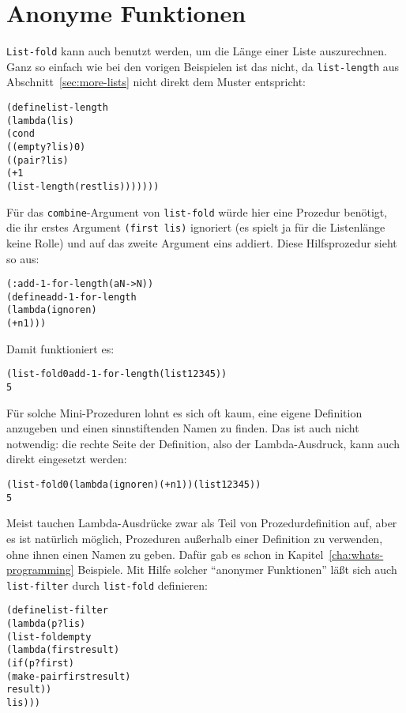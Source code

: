 \section{Anonyme Funktionen}\label{sec:anonymous-procedures}

\texttt{List-fold} kann auch benutzt werden, um die Länge einer Liste
auszurechnen.  Ganz so einfach wie bei den vorigen Beispielen ist das
nicht, da \texttt{list-length} aus
Abschnitt~\ref{sec:more-lists} nicht direkt dem Muster entspricht:
%
\begin{alltt}
(define list-length
  (lambda (lis)
    (cond
      ((empty? lis) 0)
      ((pair? lis) 
       (+ 1 
          (list-length (rest lis)))))))
\end{alltt}
%
Für das \texttt{combine}-Argument von \texttt{list-fold}
würde hier eine Prozedur benötigt, die ihr erstes
Argument \texttt{(first lis)} ignoriert (es spielt ja für die Listenlänge
keine Rolle) und auf das zweite Argument eins addiert.  Diese
Hilfsprozedur sieht so aus:
%
\begin{alltt}
(: add-1-for-length (a N -> N))
(define add-1-for-length
  (lambda (ignore n)
    (+ n 1)))
\end{alltt}
%
Damit funktioniert es:
%
\begin{alltt}
(list-fold 0 add-1-for-length (list 1 2 3 4 5))
\evalsto{} 5
\end{alltt}
%
Für solche Mini-Prozeduren lohnt es sich oft kaum, eine eigene
Definition anzugeben und einen sinnstiftenden Namen zu finden.  Das
ist auch nicht notwendig: die rechte Seite der Definition, also der
Lambda-Ausdruck, kann auch direkt eingesetzt werden:
%
\begin{alltt}
(list-fold 0 (lambda (ignore n) (+ n 1)) (list 1 2 3 4 5))
\evalsto{} 5
\end{alltt}
%
Meist tauchen Lambda-Ausdrücke zwar als Teil von Prozedurdefinition
auf, aber es ist natürlich möglich, Prozeduren außerhalb einer
Definition zu verwenden, ohne ihnen einen Namen zu geben.  Dafür gab
es schon in Kapitel~\ref{cha:whats-programming} Beispiele. Mit Hilfe
solcher "`anonymer Funktionen"' läßt sich auch \texttt{list-filter}
durch \texttt{list-fold} definieren:
%
\begin{alltt}
(define list-filter
  (lambda (p? lis)
    (list-fold empty
               (lambda (first result)
                 (if (p? first)
                     (make-pair first result)
                     result))
               lis)))
\end{alltt}
